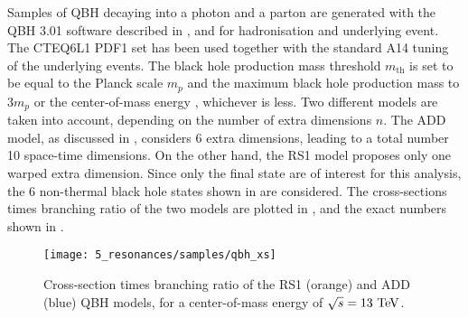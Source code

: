 Samples of QBH decaying into a photon and a parton are generated with the \ac{QBH} 3.01 software described in , and  for hadronisation and underlying event. The CTEQ6L1 \ac{PDF1} set has been used together with the standard A14 tuning of the underlying events. The black hole production mass threshold
\(m_{\text{th}}\) is set to be equal to the Planck scale \(m_p\) and the maximum black hole production mass to \(3 m_p\) or the center-of-mass energy \sqs, whichever is less. Two different models are taken into account, depending on the number of extra dimensions \(n\). The ADD model, as discussed in \Sect{\ref{subsec:theory:bsm:qbh}}, considers 6 extra dimensions, leading to a total number 10 space-time dimensions. On the other hand, the RS1 model proposes only one warped extra dimension. Since only the \gammajet final state are of interest for this analysis, the 6 non-thermal black hole states shown in \Sect{\ref{subsec:samples:samples:sig:qbh}} are considered. The cross-sections times branching ratio of the two models are plotted in \Fig{\ref{fig:samples:samples:sig:qbh:xs}}, and the exact numbers shown in \Tab{\ref{tab:samples:samples:sig:qbh:xs}}.


\begin{figure}[ht!]
    \centering
    \texttt{[image: 5\_resonances/samples/qbh\_xs]}
    \caption{Cross-section times branching ratio of the RS1 (orange) and ADD (blue) \ac{QBH} models, for a center-of-mass energy of \(\sqrt{s}=13~\text{TeV}\).}
    \label{fig:samples:samples:sig:qbh:xs}
\end{figure}


